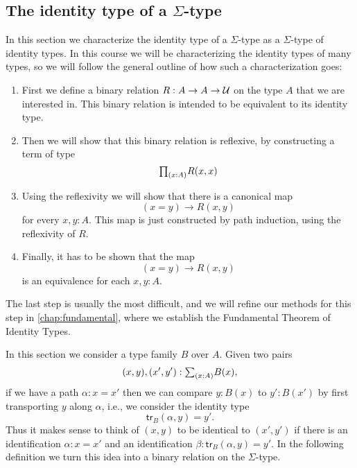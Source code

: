 \subsection{The identity type of a \texorpdfstring{$\Sigma$-}{dependent pair }type}

In this section we characterize the identity type of a $\Sigma$-type as a $\Sigma$-type of identity types. In this course we will be characterizing the identity types of many types, so we will follow the general outline of how such a characterization goes:
\begin{enumerate}
\item First we define a binary relation $R:A\to A\to \mathcal{U}$ on the type $A$ that we are interested in. This binary relation is intended to be equivalent to its identity type.
\item Then we will show that this binary relation is reflexive, by constructing a term of type
  \begin{equation*}
    \prd{x:A}R(x,x)
  \end{equation*}
\item Using the reflexivity we will show that there is a canonical map
  \begin{equation*}
    (x=y)\to R(x,y)
  \end{equation*}
  for every $x,y:A$. This map is just constructed by path induction, using the reflexivity of $R$.
\item Finally, it has to be shown that the map
  \begin{equation*}
    (x=y)\to R(x,y)
  \end{equation*}
  is an equivalence for each $x,y:A$. 
\end{enumerate}
The last step is usually the most difficult, and we will refine our methods for this step in \cref{chap:fundamental}, where we establish the Fundamental Theorem of Identity Types.

In this section we consider a type family $B$ over $A$. Given two pairs
\begin{equation*}
  (x,y),(x',y'):\sm{x:A}B(x),
\end{equation*}
if we have a path $\alpha:x=x'$ then we can compare $y:B(x)$ to $y':B(x')$ by first transporting $y$ along $\alpha$, i.e., we consider the identity type
\begin{equation*}
  \mathsf{tr}_B(\alpha,y)=y'.
\end{equation*}
Thus it makes sense to think of $(x,y)$ to be identical to $(x',y')$ if there is an identification $\alpha:x=x'$ and an identification $\beta:\mathsf{tr}_B(\alpha,y)=y'$. In the following definition we turn this idea into a binary relation on the $\Sigma$-type.

